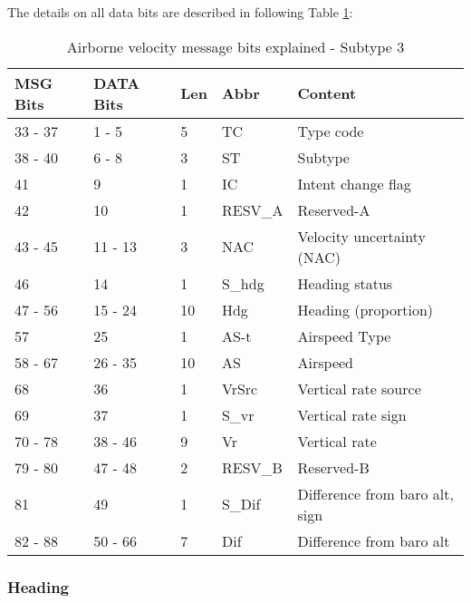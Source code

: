 The details on all data bits are described in following Table \ref{tb:adsb-v-bits-st-3}:

\begin{table}[]
\centering
\caption{Airborne velocity message bits explained - Subtype 3}
\label{tb:adsb-v-bits-st-3}
\begin{tabular}{@{}lllll@{}}
\toprule
MSG Bits   & DATA Bits   & Len & Abbr    & Content                        \\ \midrule
33 - 37    & 1 - 5       & 5   & TC      & Type code                      \\
38 - 40    & 6 - 8       & 3   & ST      & Subtype                        \\
41         & 9           & 1   & IC      & Intent change flag             \\
42         & 10          & 1   & RESV\_A & Reserved-A                     \\
43 - 45    & 11 - 13     & 3   & NAC     & Velocity uncertainty (NAC)     \\
46         & 14          & 1   & S\_hdg  & Heading status                 \\
47 - 56    & 15 - 24     & 10  & Hdg     & Heading (proportion)           \\
57         & 25          & 1   & AS-t    & Airspeed Type                  \\
58 - 67    & 26 - 35     & 10  & AS      & Airspeed                       \\
68         & 36          & 1   & VrSrc   & Vertical rate source           \\
69         & 37          & 1   & S\_vr   & Vertical rate sign             \\
70 - 78    & 38 - 46     & 9   & Vr      & Vertical rate                  \\
79 - 80    & 47 - 48     & 2   & RESV\_B & Reserved-B                     \\
81         & 49          & 1   & S\_Dif  & Difference from baro alt, sign \\
82 - 88    & 50 - 66     & 7   & Dif     & Difference from baro alt       \\ \bottomrule
\end{tabular}
\end{table}

\subsubsection{Heading}\label{heading}


